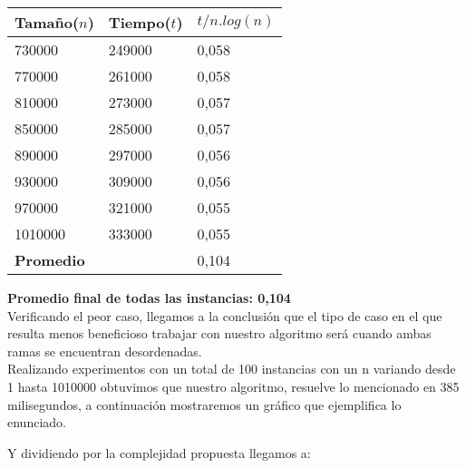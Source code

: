 \begin{table}[H]

    \begin{tabular}{ | l | l |l |}
    \hline
	Tamaño($n$) & Tiempo($t$) & \textbf{$t /n.log(n)$}  \\ \hline
730000 & 249000 & 0,058 \\ \hline
770000 & 261000 & 0,058 \\ \hline
810000 & 273000 & 0,057 \\ \hline
850000 & 285000 & 0,057 \\ \hline
890000 & 297000 & 0,056 \\ \hline
930000 & 309000 & 0,056 \\ \hline
970000 & 321000 & 0,055 \\ \hline
1010000 & 333000 & 0,055 \\ \hline
    \textbf{Promedio} & & 0,104  \\ \hline

    \end{tabular}
\end{table}

\textbf{Promedio final de todas las instancias: 0,104}\\

Verificando el peor caso, llegamos a la conclusi\'on que el tipo de caso en el que resulta menos beneficioso trabajar con nuestro algoritmo ser\'a cuando
ambas ramas se encuentran desordenadas.
\\

Realizando experimentos con un total de 100 instancias con un n variando desde 1 hasta 1010000 obtuvimos que nuestro
algoritmo, resuelve lo mencionado en 385 milisegundos, a continuaci\'on mostraremos un gr\'afico que ejemplifica lo enunciado.\\

\vspace*{0.3cm} \vspace*{0.3cm}
  \begin{center}
  \end{center}
  \vspace*{0.3cm}


Y dividiendo por la complejidad propuesta llegamos a:\\

\vspace*{0.3cm} \vspace*{0.3cm}
  \begin{center}
  \end{center}
  \vspace*{0.3cm}

